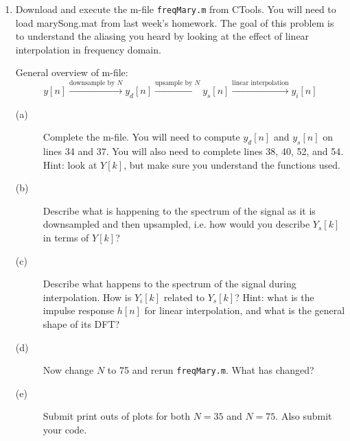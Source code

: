 \documentclass[11pt]{article}
\begin{document}
\begin{enumerate}

\item Download and execute the m-file \texttt{freqMary.m} from CTools. You will need to load marySong.mat from last week's homework. The goal of this problem is to understand the aliasing you heard by looking at the effect of linear interpolation in frequency domain.

General overview of m-file:
\[ y[n] \stackrel{\text{downsample by }N}{\longrightarrow} y_d[n] \stackrel{\text{upsample by }N}{\longrightarrow} y_s[n] \stackrel{\text{linear interpolation}}{\longrightarrow} y_i[n]
\]


\vspace{2mm}

\begin{description}
\item [(a)] Complete the m-file. You will need to compute $y_d[n]$ and $y_s[n]$ on lines 34 and 37.
You will also need to complete lines 38, 40, 52, and 54. Hint: look at $Y[k]$, but make sure you understand the functions used.

\item [(b)] Describe what is happening to the spectrum of the signal as it is downsampled and then upsampled, i.e. how would you describe $Y_s[k]$ in terms of $Y[k]$?

\item [(c)] Describe what happens to the spectrum of the signal during interpolation. How is $Y_i[k]$ related to $Y_s[k]$? Hint: what is the impulse response $h[n]$ for linear interpolation, and what is the general shape of its DFT?
 
\item [(d)] Now change $N$ to 75 and rerun \texttt{freqMary.m}. What has changed?

\item [(e)] Submit print outs of plots for both $N=35$ and $N=75$. Also submit your code.

\end{description}
%



\end{enumerate}
\end{document}
